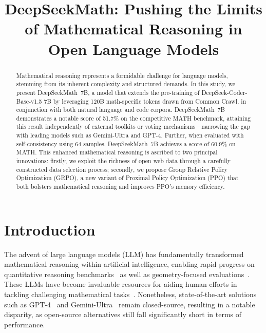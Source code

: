 \title{DeepSeekMath: Pushing the Limits of Mathematical Reasoning in Open Language Models}

\begin{abstract}
Mathematical reasoning represents a formidable challenge for language models, stemming from its inherent complexity and structured demands. In this study, we present DeepSeekMath~7B, a model that extends the pre-training of DeepSeek-Coder-Base-v1.5 7B by leveraging 120B math-specific tokens drawn from Common Crawl, in conjunction with both natural language and code corpora. DeepSeekMath~7B demonstrates a notable score of 51.7\% on the competitive MATH benchmark, attaining this result independently of external toolkits or voting mechanisms—narrowing the gap with leading models such as Gemini-Ultra and GPT-4. Further, when evaluated with self-consistency using 64 samples, DeepSeekMath~7B achieves a score of 60.9\% on MATH. This enhanced mathematical reasoning is ascribed to two principal innovations: firstly, we exploit the richness of open web data through a carefully constructed data selection process; secondly, we propose Group Relative Policy Optimization (GRPO), a new variant of Proximal Policy Optimization (PPO) that both bolsters mathematical reasoning and improves PPO’s memory efficiency.
\end{abstract}

\section{Introduction}

The advent of large language models (LLM) has fundamentally transformed mathematical reasoning within artificial intelligence, enabling rapid progress on quantitative reasoning benchmarks~\citep{MATH} as well as geometry-focused evaluations~\citep{trinh2024solving}. These LLMs have become invaluable resources for aiding human efforts in tackling challenging mathematical tasks~\citep{tao}. Nonetheless, state-of-the-art solutions such as GPT-4~\citep{gpt4} and Gemini-Ultra~\citep{gemini} remain closed-source, resulting in a notable disparity, as open-source alternatives still fall significantly short in terms of performance.

